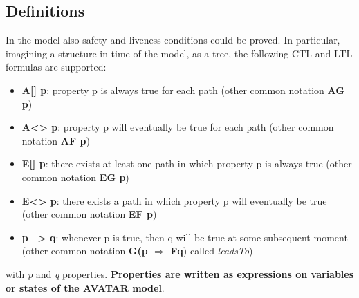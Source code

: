 \documentclass[12pt]{article}
\begin{document}
\subsection{Definitions}
In the model also safety and liveness conditions could be proved. In particular, imagining a structure in time of the model, as a tree, the following CTL and LTL formulas are supported:
\begin{itemize}
	\item \textbf{A[] p}: property p is always true for each path (other common notation \textbf{AG p})
	\item \textbf{A<> p}: property p will eventually be true for each path (other common notation \textbf{AF p})
	\item \textbf{E[] p}: there exists at least one path in which property p is always true (other common notation \textbf{EG p})
	\item \textbf{E<> p}:  there exists a path in which property p will eventually be true (other common notation \textbf{EF p})
	\item \textbf{p --> q}: whenever p is true, then q will be true at some subsequent moment (other common notation \textbf{G(p $\Rightarrow$ Fq}) called \textit{leadsTo})
\end{itemize}
with \textit{p} and \textit{q} properties. \textbf{Properties are written as expressions on variables or states of the AVATAR model}.
\end{document}
